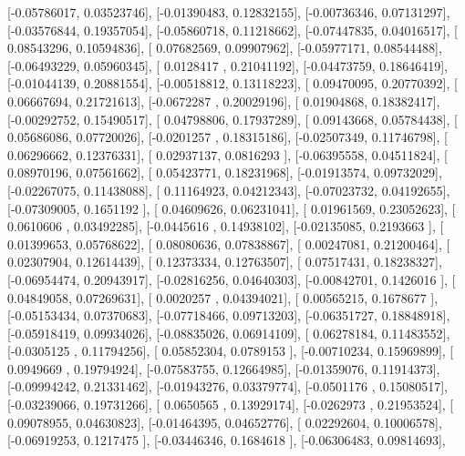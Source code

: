 \documentclass{article}
\begin{document}
       [-0.05786017,  0.03523746],
       [-0.01390483,  0.12832155],
       [-0.00736346,  0.07131297],
       [-0.03576844,  0.19357054],
       [-0.05860718,  0.11218662],
       [-0.07447835,  0.04016517],
       [ 0.08543296,  0.10594836],
       [ 0.07682569,  0.09907962],
       [-0.05977171,  0.08544488],
       [-0.06493229,  0.05960345],
       [ 0.0128417 ,  0.21041192],
       [-0.04473759,  0.18646419],
       [-0.01044139,  0.20881554],
       [-0.00518812,  0.13118223],
       [ 0.09470095,  0.20770392],
       [ 0.06667694,  0.21721613],
       [-0.0672287 ,  0.20029196],
       [ 0.01904868,  0.18382417],
       [-0.00292752,  0.15490517],
       [ 0.04798806,  0.17937289],
       [ 0.09143668,  0.05784438],
       [ 0.05686086,  0.07720026],
       [-0.0201257 ,  0.18315186],
       [-0.02507349,  0.11746798],
       [ 0.06296662,  0.12376331],
       [ 0.02937137,  0.0816293 ],
       [-0.06395558,  0.04511824],
       [ 0.08970196,  0.07561662],
       [ 0.05423771,  0.18231968],
       [-0.01913574,  0.09732029],
       [-0.02267075,  0.11438088],
       [ 0.11164923,  0.04212343],
       [-0.07023732,  0.04192655],
       [-0.07309005,  0.1651192 ],
       [ 0.04609626,  0.06231041],
       [ 0.01961569,  0.23052623],
       [ 0.0610606 ,  0.03492285],
       [-0.0445616 ,  0.14938102],
       [-0.02135085,  0.2193663 ],
       [ 0.01399653,  0.05768622],
       [ 0.08080636,  0.07838867],
       [ 0.00247081,  0.21200464],
       [ 0.02307904,  0.12614439],
       [ 0.12373334,  0.12763507],
       [ 0.07517431,  0.18238327],
       [-0.06954474,  0.20943917],
       [-0.02816256,  0.04640303],
       [-0.00842701,  0.1426016 ],
       [ 0.04849058,  0.07269631],
       [ 0.0020257 ,  0.04394021],
       [ 0.00565215,  0.1678677 ],
       [-0.05153434,  0.07370683],
       [-0.07718466,  0.09713203],
       [-0.06351727,  0.18848918],
       [-0.05918419,  0.09934026],
       [-0.08835026,  0.06914109],
       [ 0.06278184,  0.11483552],
       [-0.0305125 ,  0.11794256],
       [ 0.05852304,  0.0789153 ],
       [-0.00710234,  0.15969899],
       [ 0.0949669 ,  0.19794924],
       [-0.07583755,  0.12664985],
       [-0.01359076,  0.11914373],
       [-0.09994242,  0.21331462],
       [-0.01943276,  0.03379774],
       [-0.0501176 ,  0.15080517],
       [-0.03239066,  0.19731266],
       [ 0.0650565 ,  0.13929174],
       [-0.0262973 ,  0.21953524],
       [ 0.09078955,  0.04630823],
       [-0.01464395,  0.04652776],
       [ 0.02292604,  0.10006578],
       [-0.06919253,  0.1217475 ],
       [-0.03446346,  0.1684618 ],
       [-0.06306483,  0.09814693],
\end{document}
